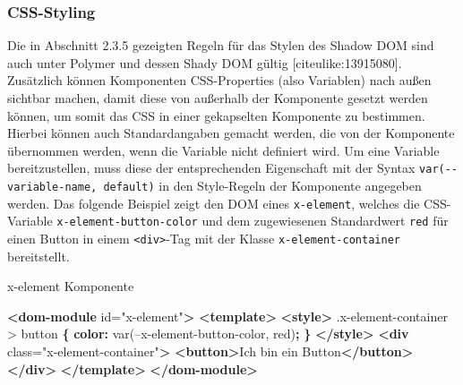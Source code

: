 \documentclass[]{article}
\newenvironment{Shaded}{}{}
\newcommand{\KeywordTok}[1]{\textcolor[rgb]{0.00,0.44,0.13}{\textbf{{#1}}}}
\newcommand{\DataTypeTok}[1]{\textcolor[rgb]{0.56,0.13,0.00}{{#1}}}
\newcommand{\FloatTok}[1]{\textcolor[rgb]{0.25,0.63,0.44}{{#1}}}
\newcommand{\StringTok}[1]{\textcolor[rgb]{0.25,0.44,0.63}{{#1}}}
\newcommand{\OtherTok}[1]{\textcolor[rgb]{0.00,0.44,0.13}{{#1}}}
\newcommand{\VariableTok}[1]{\textcolor[rgb]{0.10,0.09,0.49}{{#1}}}
\newcommand{\OperatorTok}[1]{\textcolor[rgb]{0.40,0.40,0.40}{{#1}}}
\newcommand{\AttributeTok}[1]{\textcolor[rgb]{0.49,0.56,0.16}{{#1}}}
\newcommand{\NormalTok}[1]{{#1}}
\begin{document}
\begin{Shaded}
\end{Shaded}

\subsubsection{CSS-Styling}\label{css-styling}

Die in Abschnitt 2.3.5 gezeigten Regeln für das Stylen des Shadow DOM
sind auch unter Polymer und dessen Shady DOM gültig
{[}citeulike:13915080{]}. Zusätzlich können Komponenten CSS-Properties
(also Variablen) nach außen sichtbar machen, damit diese von außerhalb
der Komponente gesetzt werden können, um somit das CSS in einer
gekapselten Komponente zu bestimmen. Hierbei können auch Standardangaben
gemacht werden, die von der Komponente übernommen werden, wenn die
Variable nicht definiert wird. Um eine Variable bereitzustellen, muss
diese der entsprechenden Eigenschaft mit der Syntax
\texttt{var(-\/-variable-name,\ default)} in den Style-Regeln der
Komponente angegeben werden. Das folgende Beispiel zeigt den DOM eines
\texttt{x-element}, welches die CSS-Variable
\texttt{x-element-button-color} und dem zugewiesenen Standardwert
\texttt{red} für einen Button in einem
\texttt{\textless{}div\textgreater{}}-Tag mit der Klasse
\texttt{x-element-container} bereitstellt.

x-element Komponente

\begin{Shaded}
\begin{Highlighting}[]
\KeywordTok{<dom-module}\OtherTok{ id=}\StringTok{"x-element"}\KeywordTok{>}
  \KeywordTok{<template>}
    \KeywordTok{<style>}
      \FloatTok{.x-element-container} \NormalTok{> button }\KeywordTok{\{}
        \KeywordTok{color:} \NormalTok{var(--x-element-button-color, }\DataTypeTok{red}\NormalTok{)}\KeywordTok{;}
      \KeywordTok{\}}
    \KeywordTok{</style>}
    \KeywordTok{<div}\OtherTok{ class=}\StringTok{"x-element-container"}\KeywordTok{>}
      \KeywordTok{<button>}\NormalTok{Ich bin ein Button}\KeywordTok{</button>}
    \KeywordTok{</div>}
  \KeywordTok{</template>}
\KeywordTok{</dom-module>}
\end{Highlighting}
\end{Shaded}
\end{document}
